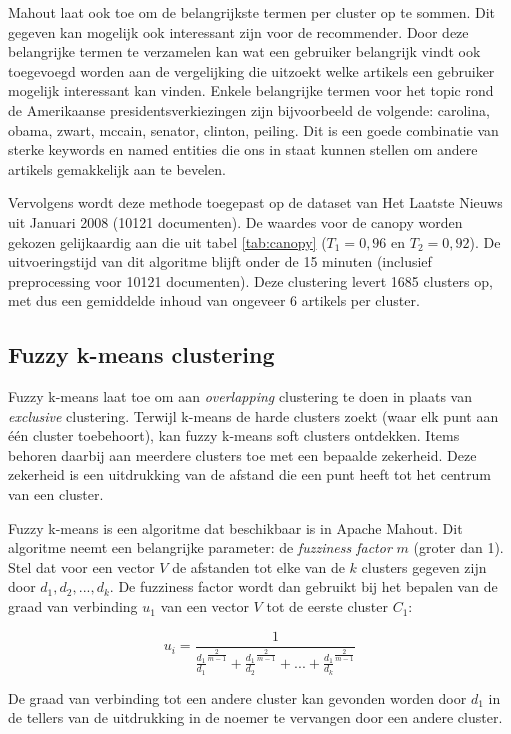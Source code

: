 Mahout laat ook toe om de belangrijkste termen per cluster op te sommen. Dit gegeven kan mogelijk ook interessant zijn voor de recommender. Door deze belangrijke termen te verzamelen kan wat een gebruiker belangrijk vindt ook toegevoegd worden aan de vergelijking die uitzoekt welke artikels een gebruiker mogelijk interessant kan vinden. Enkele belangrijke termen voor het topic rond de Amerikaanse presidentsverkiezingen zijn bijvoorbeeld de volgende: carolina, obama, zwart, mccain, senator, clinton, peiling. Dit is een goede combinatie van sterke keywords en named entities die ons in staat kunnen stellen om andere artikels gemakkelijk aan te bevelen. 

Vervolgens wordt deze methode toegepast op de dataset van Het Laatste Nieuws uit Januari 2008 (10121 documenten). De waardes voor de canopy worden gekozen gelijkaardig aan die uit tabel \ref{tab:canopy} ($T_1=0,96$ en $T_2=0,92$). De uitvoeringstijd van dit algoritme blijft onder de 15 minuten (inclusief preprocessing voor 10121 documenten). Deze clustering levert 1685 clusters op, met dus een gemiddelde inhoud van ongeveer 6 artikels per cluster. 

\subsection{Fuzzy k-means clustering}
Fuzzy k-means laat toe om aan \textit{overlapping} clustering te doen in plaats van \textit{exclusive} clustering. Terwijl k-means de harde clusters zoekt (waar elk punt aan \'e\'en cluster toebehoort), kan fuzzy k-means soft clusters ontdekken. Items behoren daarbij aan meerdere clusters toe met een bepaalde zekerheid. Deze zekerheid is een uitdrukking van de afstand die een punt heeft tot het centrum van een cluster. 

Fuzzy k-means is een algoritme dat beschikbaar is in Apache Mahout. Dit algoritme neemt een belangrijke parameter: de \textit{fuzziness factor} $m$ (groter dan 1). Stel dat voor een vector $V$ de afstanden tot elke van de $k$ clusters gegeven zijn door $d_1,d_2,...,d_k$. De fuzziness factor wordt dan gebruikt bij het bepalen van de graad van verbinding $u_1$ van een vector $V$ tot de eerste cluster $C_1$:

\begin{equation}
u_i = \frac{1}{\frac{d_1}{d_1}^{\frac{2}{m-1}}+\frac{d_1}{d_2}^{\frac{2}{m-1}}+...+\frac{d_1}{d_k}^{\frac{2}{m-1}}}
\end{equation} 

De graad van verbinding tot een andere cluster kan gevonden worden door $d_1$ in de tellers van de uitdrukking in de noemer te vervangen door een andere cluster. 

